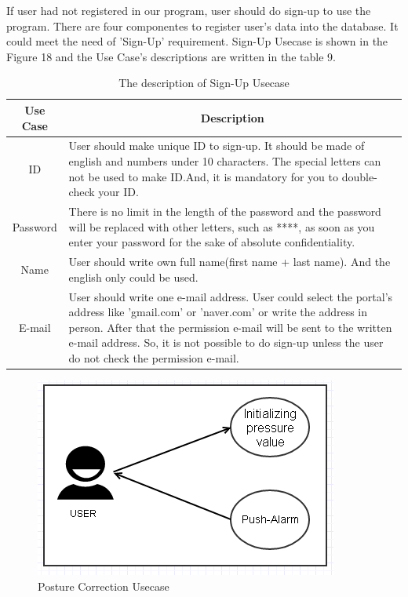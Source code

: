 \documentclass[conference]{IEEEtran}
\begin{document}
 
If user had not registered in our program, user should do sign-up to use the program. There are four componentes to register user's data into the database. It could meet the need of 'Sign-Up' requirement. Sign-Up Usecase is shown in the Figure 18 and the Use Case's descriptions are written in the table 9.

\begin{table}[h]
{\renewcommand\arraystretch{1.25}
\caption{The description of Sign-Up Usecase}
\begin{tabular}{|c|l|l|} \hline
Use Case & \multicolumn{2}{c|}{Description} \\ \hline\hline
ID& \multicolumn{2}{p{6.75cm}|}{\raggedright User should make unique ID to sign-up. It should be made of english and numbers under 10 characters. The special letters can not be used to make ID.And, it is mandatory for you to double-check your ID.} \\ \hline
Password & \multicolumn{2}{p{6.75cm}|}{\raggedright There is  no limit in the length of the password and the password will be replaced with other letters, such as ****, as soon as you enter your password for the sake of absolute confidentiality.} \\ \hline
Name& \multicolumn{2}{p{6.75cm}|}{\raggedright User should write own full name(first name + last name). And the english only could be used.} \\ \hline
E-mail& \multicolumn{2}{p{6.75cm}|}{\raggedright User should write one e-mail address. User could select the portal's address like 'gmail.com' or 'naver.com' or write the address in person. After that the permission e-mail will be sent to the written e-mail address. So, it is not possible to do sign-up unless the user do not check the permission e-mail.} \\ \hline
\end{tabular}}
\end{table} 

\begin{figure}[htbp]
\begin{center}
    \includegraphics[scale=0.8]{img_20.png}
    \caption{Posture Correction Usecase} 
\end{center}
\end{figure}
 	  
\end{document}
